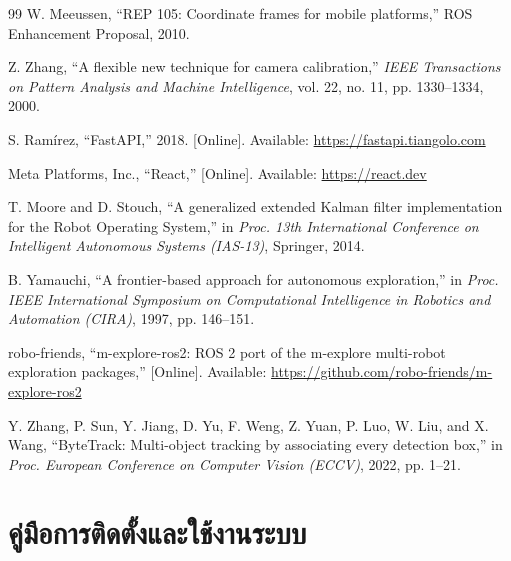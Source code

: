 \documentclass[a4paper,12pt]{report}
\makeatletter
\def\@thaialph#1{%
  \ifcase#1\or ก\or ข\or ค\or ง\or จ\or ฉ\or ช\or ซ\or ฌ\or ญ%
  \or ฎ\or ฏ\or ฐ\or ฑ\or ฒ\or ณ\or ด\or ต\or ถ\or ท%
  \or ธ\or น\or บ\or ป\or ผ\or ฝ\or พ\or ฟ\or ภ\or ม%
  \or ย\or ร\or ล\or ว\or ศ\or ษ\or ส\or ห\or ฬ\or อ\or ฮ%
  \else\@ctrerr\fi}
\newcommand{\thaialph}[1]{\expandafter\@thaialph\csname c@#1\endcsname}
\renewcommand{\cftchappresnum}{บทที่ }
\makeatother
\begin{document}
\begin{thebibliography}{99}
W. Meeussen,
``REP 105: Coordinate frames for mobile platforms,''
ROS Enhancement Proposal, 2010.

Z. Zhang,
``A flexible new technique for camera calibration,''
\textit{IEEE Transactions on Pattern Analysis and Machine Intelligence},
vol. 22, no. 11, pp. 1330--1334, 2000.

S. Ram\'irez,
``FastAPI,''
2018. [Online]. Available: \url{https://fastapi.tiangolo.com}

Meta Platforms, Inc.,
``React,''
[Online]. Available: \url{https://react.dev}

T. Moore and D. Stouch,
``A generalized extended Kalman filter implementation for the Robot Operating System,''
in \textit{Proc. 13th International Conference on Intelligent Autonomous Systems (IAS-13)},
Springer, 2014.

B. Yamauchi,
``A frontier-based approach for autonomous exploration,''
in \textit{Proc. IEEE International Symposium on Computational Intelligence
in Robotics and Automation (CIRA)}, 1997, pp. 146--151.

robo-friends,
``m-explore-ros2: ROS 2 port of the m-explore multi-robot exploration packages,''
[Online]. Available: \url{https://github.com/robo-friends/m-explore-ros2}

Y. Zhang, P. Sun, Y. Jiang, D. Yu, F. Weng, Z. Yuan, P. Luo, W. Liu, and X. Wang,
``ByteTrack: Multi-object tracking by associating every detection box,''
in \textit{Proc. European Conference on Computer Vision (ECCV)}, 2022, pp. 1--21.

\end{thebibliography}

\appendix
\renewcommand{\thechapter}{\thaialph{chapter}}

\addtocontents{toc}{\protect\renewcommand{\protect\cftchappresnum}{ภาคผนวก\protect\ }}

\chapter{คู่มือการติดตั้งและใช้งานระบบ}
\end{document}
